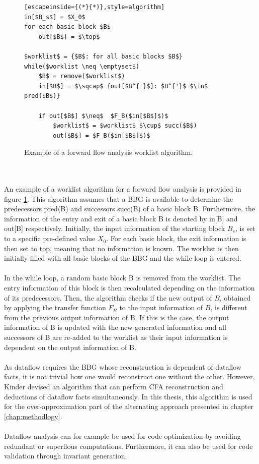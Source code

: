 \documentclass{kththesis}
\begin{document}
\begin{figure}[t]
    \centering
\begin{lstlisting}[escapeinside={(*}{*)},style=algorithm]
in[$B_s$] = $X_0$
for each basic block $B$
    out[$B$] = $\top$
    
$worklist$ = {$B$: for all basic blocks $B$}
while($worklist \neq \emptyset$)
    $B$ = remove($worklist$)
    in[$B$] = $\sqcap$ {out[$B^{'}$]: $B^{'}$ $\in$ pred($B$)}
    
    if out[$B$] $\neq$  $F_B($in[$B$]$)$
        $worklist$ = $worklist$ $\cup$ succ($B$)
        out[$B$] = $F_B($in[$B$]$)$
\end{lstlisting}
\caption[Example of a forward flow analysis worklist algorithm.]{Example of a forward flow analysis worklist algorithm.}
    \label{fig:WorklistAlgo}
\end{figure}
\noindent
\\ \\
An example of a worklist algorithm for a forward flow analysis is provided in figure \ref{fig:WorklistAlgo}. This algorithm assumes that a BBG is available to determine the predecessors pred(B) and successors succ(B) of a basic block B. Furthermore, the information of the entry and exit of a basic block B is denoted by in[B] and out[B] respectively. Initially, the  input information of the starting block $B_s$, is set to a specific pre-defined value $X_0$. For each basic block, the exit information is then set to top, meaning that no information is known. The worklist is then initially filled with all basic blocks of the BBG and the while-loop is entered.
\\ \\
In the while loop, a random basic block B is removed from the worklist. The entry information of this block is then recalculated depending on the information of its predecessors. Then, the algorithm checks if the new output of $B$, obtained by applying the transfer function $F_B$ to the input information of $B$, is different from the previous output information of B. If this is the case, the output information of B is updated with the new generated information and all successors of B are re-added to the worklist as their input information is dependent on the output information of B.
\\ \\
As dataflow requires the BBG whose reconstruction is dependent of dataflow facts, it is not trivial how one would reconstruct one without the other. However, Kinder\cite{Jakstab} devised an algorithm that can perform CFA reconstruction and deductions of dataflow facts simultaneously. In this thesis, this algorithm is used for the over-approximation part of the alternating approach presented in chapter \ref{chap:methodlogy}.
\\ \\ 
Dataflow analysis can for example be used for code optimization by avoiding redundant or superflous computations. Furthermore, it can also be used for code validation through invariant generation\cite{BordeauxSoftwareVerification}.
\end{document}
